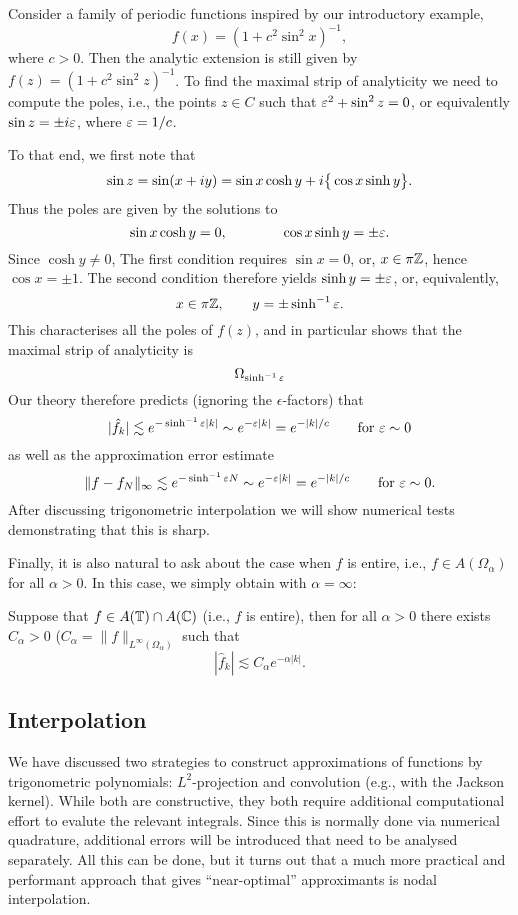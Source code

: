 \begin{example}
  Consider a family of periodic functions inspired by our introductory example,
  \[
    f(x) = (1 + c^2 \sin^2 x)^{-1},
  \]
  where $c > 0$. Then the analytic extension is still given by $f(z) = (1 + c^2
  \sin^2 z)^{-1}$. To find the maximal strip of analyticity we need to compute
  the poles, i.e., the points $z \in C$ such that $\varepsilon^2 + \sin^2 z = 0$, or
  equivalently $\sin z = \pm i \varepsilon$, where $\varepsilon = 1/c$.

  To that end, we first note that
  \[
    \sin z = \sin (x + i y) = \sin x \cosh y + i \big\{ \cos x \sinh y \big\}.
  \]
  Thus the poles are given by the solutions to
  \[
       \sin x \cosh y = 0, \qquad \qquad
       \cos x \sinh y = \pm \varepsilon.
  \]
  Since $\cosh y \neq 0$, The first condition requires $\sin x = 0$, or,
  $x \in \pi \mathbb{Z}$, hence $\cos x = \pm 1$. The second condition therefore
  yields $\sinh y = \pm \varepsilon$, or, equivalently,
  \[
      x \in \pi \mathbb{Z}, \qquad y = \pm \sinh^{-1} \varepsilon.
  \]
  This characterises all the poles of $f(z)$, and in particular shows that
  the maximal strip of analyticity is
  \[
      \Omega_{\sinh^{-1} \varepsilon}
  \]
  Our theory therefore predicts (ignoring the $\epsilon$-factors) that
  \[
      |\hat{f}_k| \lesssim e^{- \sinh^{-1} \varepsilon |k|}
            \sim e^{- \varepsilon |k|} = e^{-|k|/c} \qquad \text{for $\varepsilon \sim 0$}
  \]
  as well as the approximation error estimate
  \[
      \| f - f_N \|_\infty \lesssim e^{- \sinh^{-1} \varepsilon N} \sim e^{- \varepsilon |k|}
      = e^{-|k|/c}
      \qquad \text{for $\varepsilon \sim 0$.}
  \]
  After discussing trigonometric interpolation we will show numerical
  tests demonstrating that this is sharp.
\end{example}


Finally, it is also natural to ask about the case when $f$ is entire, i.e.,
$f \in A(\Omega_\alpha)$ for all $\alpha > 0$. In this case, we simply
obtain  with $\alpha = \infty$:

\begin{corollary} \label{th:trig:pw-entire}
  Suppose that $f \in A(\mathbb{T}) \cap A(\mathbb{C})$  (i.e., $f$ is entire), then for all
  $\alpha > 0$ there exists $C_\alpha > 0$ ($C_\alpha =
  \|f\|_{L^\infty(\Omega_\alpha)}$ such that
  \[
      |\hat{f}_k| \lesssim C_\alpha e^{-\alpha |k|}.
  \]
\end{corollary}



\subsection{Interpolation}
%
\label{sec:trig:interp}
%
We have discussed two strategies to construct approximations of functions by
trigonometric polynomials: $L^2$-projection and convolution (e.g., with the
Jackson kernel). While both are constructive, they both require additional
computational effort to evalute the relevant integrals. Since this is normally
done via numerical quadrature, additional errors will be introduced that
need to be analysed separately. All this can be done, but it turns out that
a much more practical and performant approach that gives ``near-optimal''
approximants is nodal interpolation.


